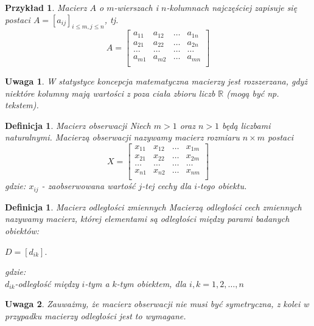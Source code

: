 \documentclass[12pt,a4paper]{report}
\newtheorem{definition}[theorem]{Definicja}
\newtheorem{uwaga}{Uwaga}
\newtheorem{example}{Przykład}
\begin{document}
\begin{example}
Macierz $A$ o $m$-wierszach i $n$-kolumnach najczęściej zapisuje się postaci $A= [a_{ij}]_{i \leq m,  j\leq n}$, tj. 
$$
A= \begin{bmatrix}
a_{11} & a_{12} & \ldots & a_{1n} \\
a_{21} & a_{22} & \ldots & a_{2n}\\ 
\ldots & \ldots & \ldots & \ldots\\
a_{m1} & a_{m2} & \ldots & a_{mn} \\
\end{bmatrix}    
$$
\end{example}

\begin{uwaga}
W statystyce koncepcja matematyczna macierzy jest rozszerzana, gdyż niektóre kolumny mają wartości z poza ciała zbioru liczb $\mathbb{R}$ (mogą być np. tekstem).
\end{uwaga}

\begin{definition}{Macierz obserwacji \cite[Rozdział 2]{mlodak2006}}
Niech $m>1$ oraz $n>1$ będą liczbami naturalnymi.  Macierzą obserwacji nazywamy macierz rozmiaru  $n \times m$  postaci
$$
X= \begin{bmatrix}
x_{11} & x_{12} & \ldots & x_{1m} \\
x_{21} & x_{22} & \ldots & x_{2m}\\
\ldots & \ldots & \ldots & \ldots \\
x_{n1} & x_{n2} & \ldots & x_{nm}\\
\end{bmatrix}
$$
gdzie:
$x_{ij}$ - zaobserwowana wartość $j$-tej cechy dla $i$-tego obiektu.
\end{definition}


\begin{definition}{Macierz odległości zmiennych \cite[Rozdział 1.6]{panek2013}}
Macierzą odległości cech zmiennych nazywamy macierz, której elementami są odległości między parami badanych obiektów: 
\begin{center}
$D = [d_{ik}].$\\
\end{center}
gdzie:\\
$d_{ik}$-odległość między $i$-tym a $k$-tym obiektem, dla $i,k=1,2,\ldots,n$
\end{definition}

\begin{uwaga}
Zauważmy, że macierz obserwacji nie musi być symetryczna, z kolei w przypadku macierzy odległości jest to wymagane.
\end{uwaga}
\end{document}
